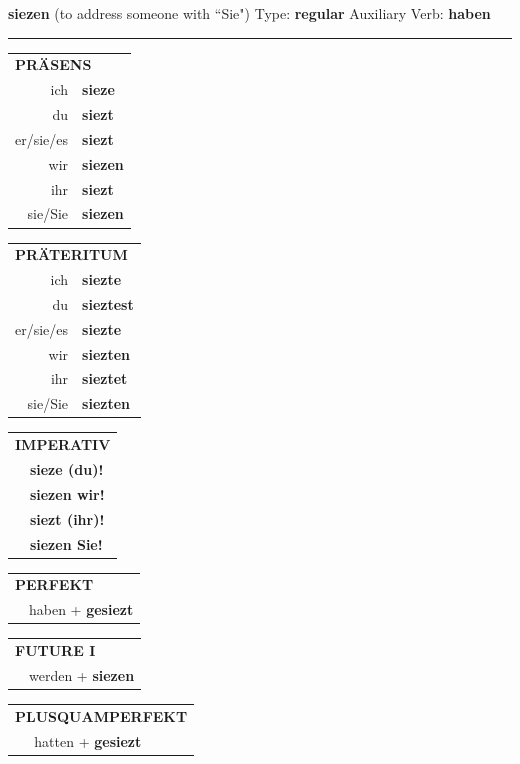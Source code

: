 \documentclass[10pt,a4paper]{revtex4-2}
\begin{document}
\begin{verbbox}
{\Large \bf siezen} (to address someone with ``Sie") \hfill Type: \textbf{regular} \hfill Auxiliary Verb: \textbf{haben}

\vspace{5pt}
\hrule
\vspace{5pt}

\begin{tabular}{rl}
\multicolumn{2}{l}{\textbf{PRÄSENS}}\\
ich & \textbf{sieze}\\
du & \textbf{siezt}\\
er/sie/es & \textbf{siezt}\\
wir & \textbf{siezen}\\
ihr & \textbf{siezt}\\
sie/Sie & \textbf{siezen}\\
\end{tabular}
\hfill
\begin{tabular}{rl}
\multicolumn{2}{l}{\textbf{PRÄTERITUM}}\\
ich & \textbf{siezte}\\
du & \textbf{sieztest}\\
er/sie/es & \textbf{siezte}\\
wir & \textbf{siezten}\\
ihr & \textbf{sieztet}\\
sie/Sie & \textbf{siezten}\\
\end{tabular}
\hfill
\begin{tabular}{rl}
\multicolumn{2}{l}{\textbf{IMPERATIV}}\\
& \textbf{sieze (du)!}\\
& \textbf{siezen wir!}\\
& \textbf{siezt (ihr)!}\\
& \textbf{siezen Sie!}\\
\end{tabular}

\vspace{10pt}

\begin{tabular}{rl}
\multicolumn{2}{l}{\textbf{PERFEKT}}\\
& haben + \textbf{gesiezt}\\
\end{tabular}
\hfill
\begin{tabular}{rl}
\multicolumn{2}{l}{\textbf{FUTURE I}}\\
& werden + \textbf{siezen}\\
\end{tabular}
\hfill
\begin{tabular}{rl}
\multicolumn{2}{l}{\textbf{PLUSQUAMPERFEKT}}\\
& hatten + \textbf{gesiezt}\\
\end{tabular}


\end{verbbox}
\end{document}
